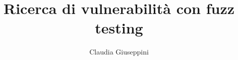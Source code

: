 \documentclass[italian,twoside,binding=0.6cm]{sapthesis}
\title{Ricerca di vulnerabilità con fuzz testing}
\author{Claudia Giuseppini}
\begin{document}
\frontmatter 
\maketitle

\begin{abstract}
\end{abstract}

\tableofcontents

\mainmatter






\backmatter %
\cleardoublepage
{}
{}


\end{document}
